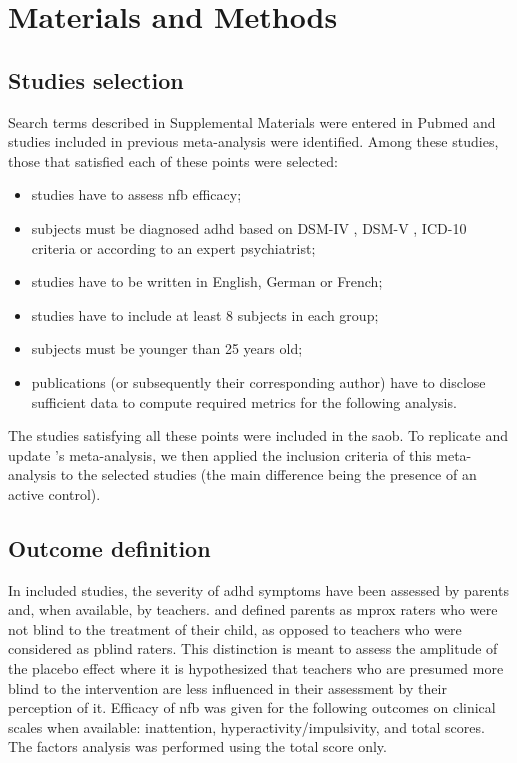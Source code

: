 

\section{Materials and Methods}

\subsection{Studies selection}

Search terms described in Supplemental Materials \citep{Supplementalmaterial} were entered in Pubmed 
and studies included in previous meta-analysis were identified. Among these studies, those that 
satisfied each of these points were selected:
\begin{itemize}
	\item studies have to assess \gls{nfb} efficacy; 
	\item subjects must be diagnosed \gls{adhd} based on DSM-IV \citep{DSM-4}, DSM-V \citep{DSM-5}, 
	ICD-10 \citep{ICD101993} criteria or according to an expert psychiatrist; 
	\item studies have to be written in English, German or French;
	\item studies have to include at least 8 subjects in each group;
	\item subjects must be younger than 25 years old;
  \item publications (or subsequently their corresponding author) have to disclose sufficient data 
	to compute required metrics for the following analysis.
\end{itemize} 
The studies satisfying all these points were included in the \gls{saob}. To replicate and update 
\citeauthor{Cortese2016}'s meta-analysis, we then applied the inclusion criteria of this meta-analysis 
to the selected studies (the main difference being the presence of an active control). 

\subsection{Outcome definition} 

In included studies, the severity of \gls{adhd} symptoms have been assessed by parents and, when available, 
by teachers. \citet{Cortese2016} and \citet{Micoulaud2014} defined parents as \gls{mprox} raters who were 
not blind to the treatment of their child, as opposed to teachers who were considered as \gls{pblind} raters. 
This distinction is meant to assess the amplitude of the placebo effect where it is hypothesized that teachers 
who are presumed more blind to the intervention are less influenced in their assessment by their perception of it. 
Efficacy of \gls{nfb} was given for the following outcomes on clinical scales when available: inattention, 
hyperactivity/impulsivity, and total scores. The factors analysis was performed using the total score only.

